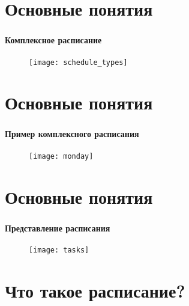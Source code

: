 
\section{Основные понятия}

\begin{frame}
\frametitle{\insertsection}
\framesubtitle{Комплексное расписание}

\begin{figure}
    \center
    \texttt{[image: schedule\_types]}
\end{figure}
\end{frame}


\section{Основные понятия}

\begin{frame}
\frametitle{\insertsection}
\framesubtitle{Пример комплексного расписания}

\begin{figure}
    \center
    \texttt{[image: monday]}
\end{figure}
\end{frame}


\section{Основные понятия}

\begin{frame}
\frametitle{\insertsection}
\framesubtitle{Представление расписания}

\begin{figure}
    \center
    \texttt{[image: tasks]}
\end{figure}
\end{frame}


\section{Что такое расписание?}

